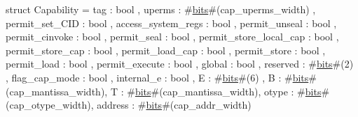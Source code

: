 struct Capability = {
  tag                    : bool    ,
  uperms                 : #\hyperref[sailRISCVzbits]{bits}#(cap_uperms_width) ,
  permit_set_CID         : bool    ,
  access_system_regs     : bool    ,
  permit_unseal          : bool    ,
  permit_cinvoke         : bool    ,
  permit_seal            : bool    ,
  permit_store_local_cap : bool    ,
  permit_store_cap       : bool    ,
  permit_load_cap        : bool    ,
  permit_store           : bool    ,
  permit_load            : bool    ,
  permit_execute         : bool    ,
  global                 : bool    ,
  reserved               : #\hyperref[sailRISCVzbits]{bits}#(2) ,
  flag_cap_mode          : bool    ,
  internal_e             : bool    ,
  E                      : #\hyperref[sailRISCVzbits]{bits}#(6) ,
  B                      : #\hyperref[sailRISCVzbits]{bits}#(cap_mantissa_width),
  T                      : #\hyperref[sailRISCVzbits]{bits}#(cap_mantissa_width),
  otype                  : #\hyperref[sailRISCVzbits]{bits}#(cap_otype_width),
  address                : #\hyperref[sailRISCVzbits]{bits}#(cap_addr_width)
}
